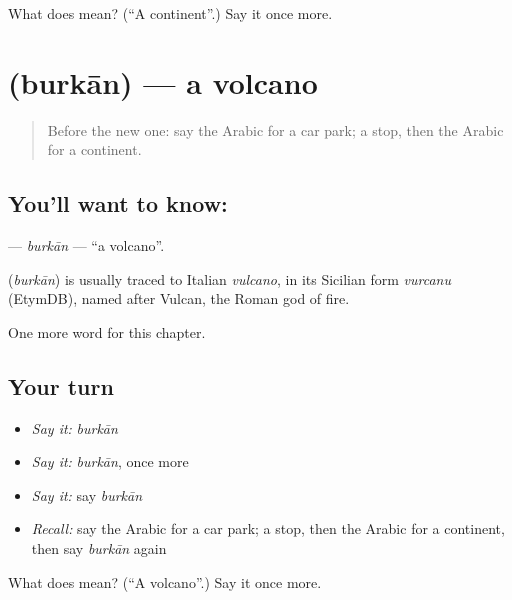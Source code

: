 \begin{tcolorbox}[breakable,colback=teal!4,colframe=teal!35!black,title={Before you move on}]
What does  mean? (\textquotedblleft{}A continent\textquotedblright{}.) Say it once more.
\end{tcolorbox}
\section[\texorpdfstring{\ar{بركان} (burkān)}{بركان (burkān)}]{ (burkān) — a volcano}

\label{lesson:AR-C173-burkan}



\begin{quote}
Before the new one: say the Arabic for a car park; a stop, then the Arabic for a continent.
\end{quote}

\subsection*{You'll want to know: }
\textbf{} — \emph{burkān} — \textquotedblleft{}a volcano\textquotedblright{}.

\begin{cousinweb}
\textbf{} (\emph{burkān}) is usually traced to Italian \emph{vulcano}, in its Sicilian form \emph{vurcanu} (EtymDB), named after Vulcan, the Roman god of fire.
\end{cousinweb}

\begin{grammarlens}[title={What you've built}]
One more word for this chapter.
\end{grammarlens}

\subsection*{Your turn}
\begin{itemize}
\raggedright
  \item \emph{Say it:} \emph{burkān}
  \item \emph{Say it:} \emph{burkān}, once more
  \item \emph{Say it:} say \emph{burkān}
  \item \emph{Recall:} say the Arabic for a car park; a stop, then the Arabic for a continent, then say \emph{burkān} again
\end{itemize}

\begin{tcolorbox}[breakable,colback=teal!4,colframe=teal!35!black,title={Before you move on}]
What does  mean? (\textquotedblleft{}A volcano\textquotedblright{}.) Say it once more.
\end{tcolorbox}
